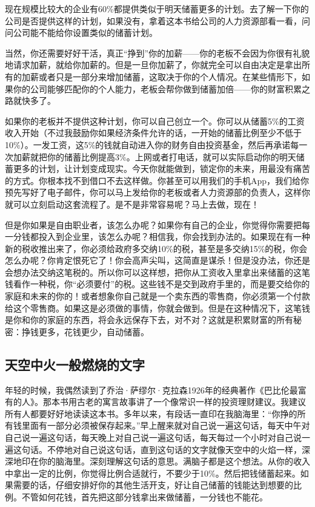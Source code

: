 现在规模比较大的企业有60\%都提供类似于明天储蓄更多的计划。去了解一下你的公司是否提供这样的计划，如果没有，拿着这本书给公司的人力资源部看一看，问问公司能不能给你设置类似的储蓄计划。

当然，你还需要好好干活，真正“挣到”你的加薪——你的老板不会因为你很有礼貌地请求加薪，就给你加薪的。但是一旦你加薪了，你就完全可以自由决定是拿出所有的加薪或者只是一部分来增加储蓄，这取决于你的个人情况。在某些情形下，如果你的公司能够匹配你的个人能力，老板会帮你做到储蓄加倍——你的财富积累之路就快多了。

如果你的老板并不提供这种计划，你可以自己创立一个。你可以从储蓄5\%的工资收入开始（不过我鼓励你如果经济条件允许的话，一开始的储蓄比例至少不低于10\%）。一发工资，这5\%的钱就自动进入你的财务自由投资基金，然后再承诺每一次加薪就把你的储蓄比例提高3\%。上网或者打电话，就可以实际启动你的明天储蓄更多的计划，让计划变成现实。今天你就能做到，锁定你的未来，用最没有痛苦的方式。你根本找不到借口不去这样做。你甚至可以用我们的手机App，我们给你预先写好了电子邮件，你可以马上发给你的老板或者人力资源部的负责人，这样你就可以立刻启动这套流程了。是不是非常容易呢？马上去做，现在！

但是你如果是自由职业者，该怎么办呢？如果你有自己的企业，你觉得你需要把每一分钱都投入到企业里，该怎么办呢？相信我，你会找到办法的。如果现在有一种新的税收推出来了，你必须给政府多交纳10\%的税，甚至是多交纳15\%的税，你会怎么办呢？你肯定恨死它了！你会高声尖叫，这简直是谋杀！但是没办法，你还是会想办法交纳这笔税的。所以你可以这样想，把你从工资收入里拿出来储蓄的这笔钱看作一种税，你“必须要付”的税。这些钱不是交到政府手里的，而是要交给你的家庭和未来的你的！或者想象你自己就是一个卖东西的零售商，你必须第一个付款给这个零售商。如果这是必须做的事情，你就会做到。但是在这种情况下，这笔钱是你和你的家庭的东西，将会永远保存下去，对不对？这就是积累财富的所有秘密：挣钱更多，花钱更少，自动储蓄。

\subsection{天空中火一般燃烧的文字}

年轻的时候，我偶然读到了乔治·萨缪尔·克拉森1926年的经典著作《巴比伦最富有的人》。那本书用古老的寓言故事讲了一个像常识一样的投资理财建议。我建议所有人都要好好地读读这本书。多年以来，有段话一直印在我脑海里：“你挣的所有钱里面有一部分必须被保存起来。”早上醒来就对自己说一遍这句话，每天中午对自己说一遍这句话，每天晚上对自己说一遍这句话，每天每过一个小时对自己说一遍这句话。不停地对自己说这句话，直到这句话的文字就像天空中的火焰一样，深深地印在你的脑海里。深刻理解这句话的意思。满脑子都是这个想法。从你的收入中拿出一定的比例，你觉得比例合适就行，不要少于10\%。然后把钱储蓄起来。如果需要的话，仔细安排好你的其他生活开支，好让自己储蓄的钱能达到想要的比例。不管如何花钱，首先把这部分钱拿出来做储蓄，一分钱也不能花。

